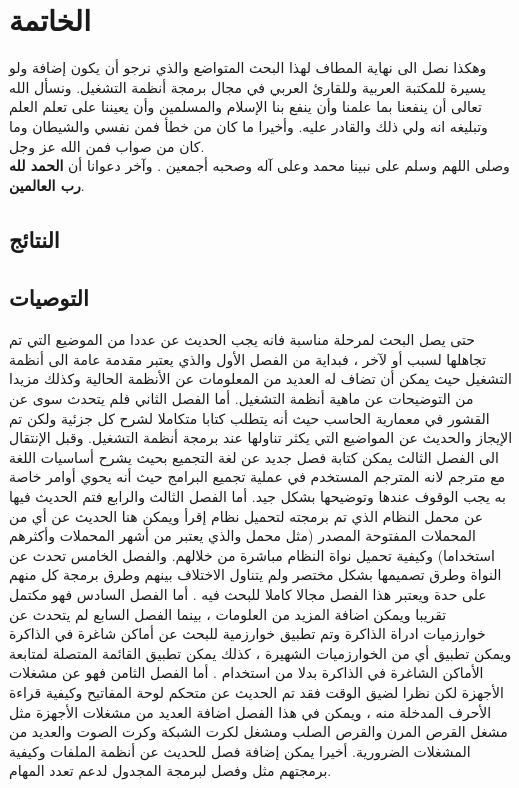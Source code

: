 \documentclass[document.tex]{subfiles}
\begin{document}
\chapter*{الخاتمة}
وهكذا نصل الى نهاية المطاف لهذا البحث المتواضع والذي نرجو أن يكون إضافة ولو يسيرة للمكتبة العربية وللقارئ العربي في مجال برمجة أنظمة التشغيل. ونسأل الله تعالى أن ينفعنا بما علمنا وأن ينفع بنا الإسلام والمسلمين وأن يعيننا على تعلم العلم وتبليغه انه ولي ذلك والقادر عليه. وأخيرا ما كان من خطأ فمن نفسي والشيطان وما كان من صواب فمن الله عز وجل.\\

وصلى اللهم وسلم على نبينا محمد وعلى آله وصحبه أجمعين . وآخر دعوانا أن \textbf{الحمد لله رب العالمين}.

\section*{النتائج}


\section*{التوصيات}
حتى يصل البحث لمرحلة مناسبة فانه يجب الحديث عن عددا من الموضيع التي تم تجاهلها لسبب أو لآخر ، فبداية من الفصل الأول والذي يعتبر مقدمة عامة الى أنظمة التشغيل حيث يمكن أن تضاف له العديد من المعلومات عن الأنظمة الحالية وكذلك مزيدا من التوضيحات عن ماهية أنظمة التشغيل. أما الفصل الثاني فلم يتحدث سوى عن القشور في معمارية الحاسب حيث أنه يتطلب كتابا متكاملا لشرح كل جزئية ولكن تم الإيجاز والحديث عن المواضيع التي يكثر تناولها عند برمجة أنظمة التشغيل.  وقبل الإنتقال الى الفصل الثالث يمكن كتابة فصل جديد عن لغة التجميع بحيث يشرح أساسيات اللغة مع مترجم  لانه المترجم المستخدم في عملية تجميع البرامج حيث أنه يحوي أوامر خاصة به يجب الوقوف عندها وتوضيحها بشكل جيد. أما الفصل الثالث والرابع فتم الحديث فيها عن محمل النظام الذي تم برمجته لتحميل نظام إقرأ ويمكن هنا الحديث عن أي من المحملات المفتوحة المصدر (مثل محمل  والذي يعتبر من أشهر المحملات وأكثرهم استخداما) وكيفية تحميل نواة النظام مباشرة من خلالهم. والفصل الخامس تحدث عن النواة وطرق تصميمها بشكل مختصر ولم يتناول الاختلاف بينهم وطرق برمجة كل منهم على حدة ويعتبر هذا الفصل مجالا كاملا للبحث فيه .  أما الفصل السادس فهو مكتمل تقريبا ويمكن اضافة المزيد من العلومات ، بينما الفصل السابع لم يتحدث عن خوارزميات ادراة الذاكرة وتم تطبيق خوارزمية  للبحث عن أماكن شاغرة في الذاكرة ويمكن تطبيق أي من الخوارزميات الشهيرة ، كذلك يمكن تطبيق القائمة المتصلة لمتابعة الأماكن الشاغرة في الذاكرة بدلا من استخدام . أما الفصل الثامن فهو عن مشغلات الأجهزة لكن نظرا لضيق الوقت فقد تم الحديث عن متحكم لوحة المفاتيح وكيفية قراءة الأحرف المدخلة منه ، ويمكن في هذا الفصل اضافة العديد من مشغلات الأجهزة مثل مشغل القرص المرن والقرص الصلب ومشغل لكرت الشبكة وكرت الصوت والعديد من المشغلات الضرورية. أخيرا يمكن إضافة فصل للحديث عن أنظمة الملفات وكيفية برمجتهم مثل  وفصل لبرمجة المجدول لدعم تعدد المهام.\\\\
\end{document}
